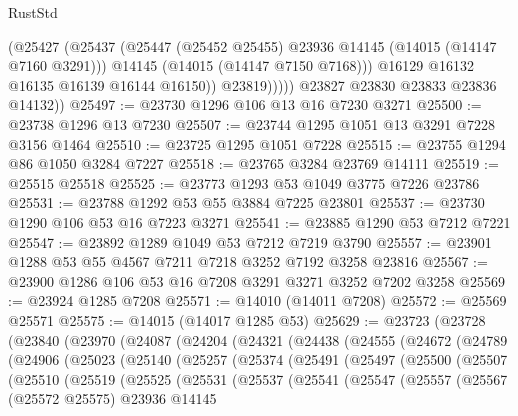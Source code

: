 \begin{lexlean}{RustStd}
\begin{coremodule}
                    (@25427
                      (@25437
                        (@25447 (@25452 @25455) @23936 @14145 (@14015 (@14147 @7160 @3291)))
                        @14145
                        (@14015 (@14147 @7150 @7168)))
                      @16129
                      @16132
                      @16135
                      @16139
                      @16144
                      @16150))
                  @23819)))))
        @23827
        @23830
        @23833
        @23836
        @14132))
@25497 := @23730 @1296 @106 @13 @16 @7230 @3271
@25500 := @23738 @1296 @13 @7230
@25507 := @23744 @1295 @1051 @13 @3291 @7228 @3156 @1464
@25510 := @23725 @1295 @1051 @7228
@25515 := @23755 @1294 @86 @1050 @3284 @7227
@25518 := @23765 @3284 @23769 @14111
@25519 := @25515 @25518
@25525 := @23773 @1293 @53 @1049 @3775 @7226 @23786
@25531 := @23788 @1292 @53 @55 @3884 @7225 @23801
@25537 := @23730 @1290 @106 @53 @16 @7223 @3271
@25541 := @23885 @1290 @53 @7212 @7221
@25547 := @23892 @1289 @1049 @53 @7212 @7219 @3790
@25557 := @23901 @1288 @53 @55 @4567 @7211 @7218 @3252 @7192 @3258 @23816
@25567 := @23900 @1286 @106 @53 @16 @7208 @3291 @3271 @3252 @7202 @3258
@25569 := @23924 @1285 @7208
@25571 := @14010 (@14011 @7208)
@25572 := @25569 @25571
@25575 := @14015 (@14017 @1285 @53)
@25629 := @23723
    (@23728
      (@23840
        (@23970
          (@24087
            (@24204
              (@24321
                (@24438
                  (@24555
                    (@24672
                      (@24789
                        (@24906
                          (@25023
                            (@25140
                              (@25257
                                (@25374
                                  (@25491
                                    (@25497
                                      (@25500
                                        (@25507
                                          (@25510
                                            (@25519
                                              (@25525
                                                (@25531
                                                  (@25537
                                                    (@25541
                                                      (@25547
                                                        (@25557
                                                          (@25567
                                                            (@25572 @25575)
                                                            @23936
                                                            @14145

\end{coremodule}
\end{lexlean}
